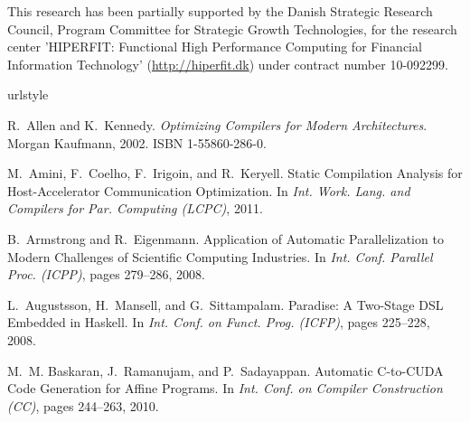 \documentclass{sigplanconf}  %
\begin{document}

\enlargethispage{\baselineskip}
\acks
This research has been partially supported by the Danish
Strategic Research Council, Program Committee for Strategic Growth
Technologies, for the research center 'HIPERFIT: Functional High
Performance Computing for Financial Information Technology'
(\url{http://hiperfit.dk}) under contract number 10-092299.




\softraggedright
%

\begin{thebibliography}{49}
\providecommand{\natexlab}[1]{#1}
\providecommand{\url}[1]{\texttt{#1}}
\expandafter\ifx\csname urlstyle\endcsname\relax
  \providecommand{\doi}[1]{doi: #1}\else
  \providecommand{\doi}{doi: \begingroup \urlstyle{rm}\Url}\fi

R.~Allen and K.~Kennedy.
\newblock \emph{{O}ptimizing {C}ompilers for {M}odern {A}rchitectures}.
\newblock Morgan Kaufmann, 2002.
\newblock ISBN 1-55860-286-0.

M.~Amini, F.~Coelho, F.~Irigoin, and R.~Keryell.
\newblock Static {C}ompilation {A}nalysis for {H}ost-{A}ccelerator
  {C}ommunication {O}ptimization.
\newblock In \emph{Int. Work. Lang. and Compilers for Par. Computing (LCPC)},
  2011.

B.~Armstrong and R.~Eigenmann.
\newblock Application of {A}utomatic {P}arallelization to {M}odern {C}hallenges
  of {S}cientific {C}omputing {I}ndustries.
\newblock In \emph{Int. Conf. Parallel Proc. (ICPP)}, pages 279--286, 2008.

L.~Augustsson, H.~Mansell, and G.~Sittampalam.
\newblock Paradise: {A} {T}wo-{S}tage {DSL} {E}mbedded in {Haskell}.
\newblock In \emph{Int. Conf. on Funct. Prog. (ICFP)}, pages 225--228, 2008.

M.~M. Baskaran, J.~Ramanujam, and P.~Sadayappan.
\newblock Automatic {C}-to-{CUDA} {C}ode {G}eneration for {A}ffine {P}rograms.
\newblock In \emph{Int. Conf. on Compiler Construction (CC)}, pages 244--263,
  2010.


\end{thebibliography}
\end{document}
